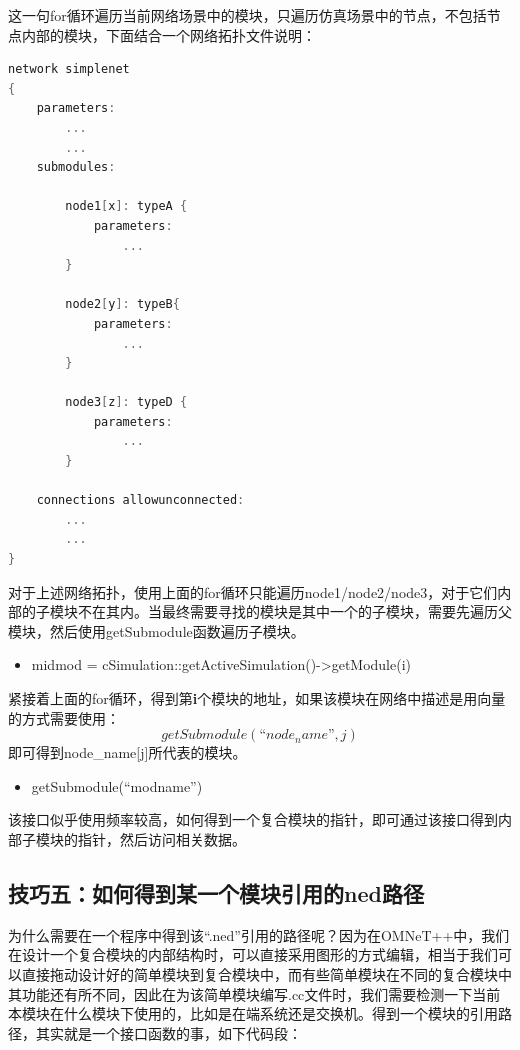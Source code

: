 这一句for循环遍历当前网络场景中的模块，只遍历仿真场景中的节点，不包括节点内部的模块，下面结合一个网络拓扑文件说明：

\begin{lstlisting}[language=c]
network simplenet
{
    parameters:
        ...
        ...
    submodules:

        node1[x]: typeA {
            parameters:
                ...
        }

        node2[y]: typeB{
            parameters:
                ...
        }

        node3[z]: typeD {
            parameters:
                ...
        }

    connections allowunconnected:
        ...
        ...
}

\end{lstlisting}

对于上述网络拓扑，使用上面的for循环只能遍历node1\slash node2\slash node3，对于它们内部的子模块不在其内。当最终需要寻找的模块是其中一个的子模块，需要先遍历父模块，然后使用getSubmodule函数遍历子模块。

\begin{itemize}
\item midmod = cSimulation::getActiveSimulation()->getModule(i)

\end{itemize}

紧接着上面的for循环，得到第\textbf{i}个模块的地址，如果该模块在网络中描述是用向量的方式需要使用：
$$getSubmodule(“node_name”,j)$$
即可得到node\_name{[j]}所代表的模块。

\begin{itemize}
\item getSubmodule(``modname'')

\end{itemize}

该接口似乎使用频率较高，如何得到一个复合模块的指针，即可通过该接口得到内部子模块的指针，然后访问相关数据。

\subsection{技巧五：如何得到某一个模块引用的ned路径}
\label{技巧五：如何得到某一个模块引用的ned路径}

为什么需要在一个程序中得到该``.ned''引用的路径呢？因为在OMNeT++中，我们在设计一个复合模块的内部结构时，可以直接采用图形的方式编辑，相当于我们可以直接拖动设计好的简单模块到复合模块中，而有些简单模块在不同的复合模块中其功能还有所不同，因此在为该简单模块编写.cc文件时，我们需要检测一下当前本模块在什么模块下使用的，比如是在端系统还是交换机。得到一个模块的引用路径，其实就是一个接口函数的事，如下代码段：

